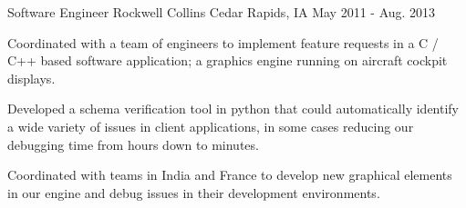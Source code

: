 \begin{cventries}
  \cventry
    {Software Engineer} %
    {Rockwell Collins} %
    {Cedar Rapids, IA} %
    {May 2011 - Aug. 2013} %
    {
      \begin{cvitems} %
        \item {Coordinated with a team of engineers to implement feature requests in a C / C++ based software application; a graphics engine running on aircraft cockpit displays.}
        \item {Developed a schema verification tool in python that could automatically identify a wide variety of issues in client applications, in some cases reducing our debugging time from hours down to minutes.}
        \item {Coordinated with teams in India and France to develop new graphical elements in our engine and debug issues in their development environments.}
      \end{cvitems}
    }

\end{cventries}
